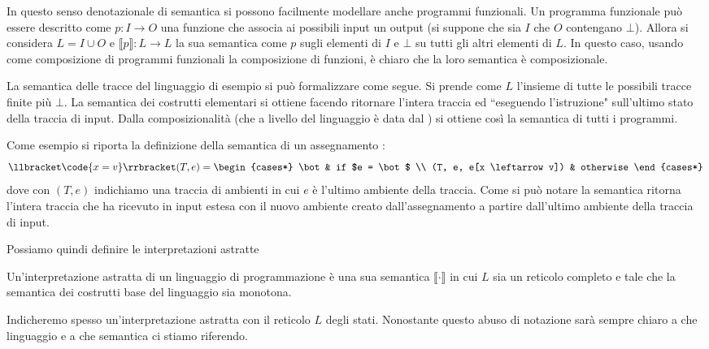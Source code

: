 \documentclass[12pt]{article}
\numberwithin{theorem}{subsection}
\begin{document}
In questo senso denotazionale di semantica si possono facilmente modellare anche programmi funzionali. Un programma funzionale può essere descritto come $p: I \rightarrow O$ una funzione che associa ai possibili input un output (si suppone che sia $I$ che $O$ contengano $\bot$). Allora si considera $L = I \cup O$ e $\llbracket p \rrbracket: L \rightarrow L$ la sua semantica come $p$ sugli elementi di $I$ e $\bot$ su tutti gli altri elementi di $L$.
In questo caso, usando come composizione di programmi funzionali la composizione di funzioni, è chiaro che la loro semantica è composizionale.

\begin{example}
	La semantica delle tracce del linguaggio di esempio si può formalizzare come segue.
	Si prende come $L$ l'insieme di tutte le possibili tracce finite più $\bot$. La semantica dei costrutti elementari si ottiene facendo ritornare l'intera traccia ed ``eseguendo l'istruzione" sull'ultimo stato della traccia di input. Dalla composizionalità (che a livello del linguaggio è data dal \code{;}) si ottiene così la semantica di tutti i programmi.
	
	Come esempio si riporta la definizione della semantica di un assegnamento :
	\begin{equation*}
		\llbracket \code{x = v} \rrbracket (T, e) = \begin{cases*}
			\bot & if $e = \bot$ \\
			(T, e, e[x \leftarrow v]) & otherwise
		\end{cases*}
	\end{equation*}
	dove con $(T, e)$ indichiamo una traccia di ambienti in cui $e$ è l'ultimo ambiente della traccia.
	Come si può notare la semantica ritorna l'intera traccia che ha ricevuto in input estesa con il nuovo ambiente creato dall'assegnamento a partire dall'ultimo ambiente della traccia di input.
\end{example}

Possiamo quindi definire le interpretazioni astratte
\begin{definition}
	Un'interpretazione astratta di un linguaggio di programmazione è una sua semantica $\llbracket \cdot \rrbracket$ in cui $L$ sia un reticolo completo e tale che la semantica dei costrutti base del linguaggio sia monotona.
\end{definition}

Indicheremo spesso un'interpretazione astratta con il reticolo $L$ degli stati. Nonostante questo abuso di notazione sarà sempre chiaro a che linguaggio e a che semantica ci stiamo riferendo.
\end{document}
